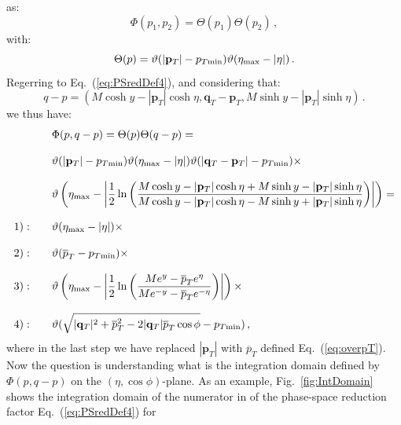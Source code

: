\documentclass[10pt,a4paper]{article}
\begin{document}
as:
\begin{equation}
\Phi(p_1,p_2) = \Theta(p_1)\Theta(p_2)\,,
\end{equation}
with:
\begin{equation}
\Theta(p) = \vartheta(|\mathbf{p}_{T}| - p_{T\rm min})
\vartheta(\eta_{\rm max}-|\eta|)\,.
\end{equation}
Regerring to Eq.~(\ref{eq:PSredDef4}), and considering that:
\begin{equation}
q-p=\left(M\cosh y-|\mathbf{p}_T|\cosh\eta,\mathbf{q}_T-\mathbf{p}_T,M\sinh y-|\mathbf{p}_T|\sinh\eta\right)\,.
\end{equation}
we thus have:
\begin{equation}\label{eq:intdomain}
\begin{array}{ll}
&\Phi(p,q-p) = \Theta(p) \Theta(q-p)=\\
\\
&\displaystyle \vartheta(|\mathbf{p}_{T}| - p_{T\rm min})
\vartheta(\eta_{\rm max}-|\eta|)
\vartheta(|\mathbf{q}_{T}-\mathbf{p}_{T}| - p_{T\rm min})\times\\
\\
&\displaystyle \vartheta\left(\eta_{\rm max}-\left|\frac12\ln\left(\frac{M\cosh y-|\mathbf{p}_T|\cosh\eta+M\sinh y-|\mathbf{p}_T|\sinh\eta}{M\cosh y-|\mathbf{p}_T|\cosh\eta-M\sinh y+|\mathbf{p}_T|\sinh\eta}\right)\right|\right)=\\
\\
1):\quad&\displaystyle \vartheta(\eta_{\rm max}-|\eta|) \times\\
\\
2):\quad&\displaystyle \vartheta(\overline{p}_T - p_{T\rm min})\times\\
\\
3):\quad&\displaystyle 
  \vartheta\left(\eta_{\rm max}-\left|\frac12\ln\left(\frac{Me^y-\overline{p}_Te^\eta}{Me^{-y}-\overline{p}_Te^{-
\eta}}\right)\right|\right)\times\\
\\
4):\quad&\displaystyle \vartheta(\sqrt{|\mathbf{q}_T|^2+\overline{p}_T^2-2 |\mathbf{q}_T|\overline{p}_T\cos\phi} - p_{T\rm min})\,,
\end{array}
\end{equation}
where in the last step we have replaced $|\mathbf{p}_T|$ with
$\overline{p}_T$ defined Eq.~(\ref{eq:overpT}). Now the question is
understanding what is the integration domain defined by $\Phi(p,q-p)$
on the $(\eta,\cos\phi)$-plane. As an example,
Fig.~\ref{fig:IntDomain} shows the integration domain of the numerator
in of the phase-space reduction factor Eq.~(\ref{eq:PSredDef4}) for
\end{document}
